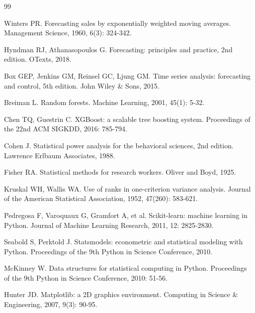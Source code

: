 

\begin{thebibliography}{99}

 Winters PR. Forecasting sales by exponentially weighted moving averages. Management Science, 1960, 6(3): 324-342.

 Hyndman RJ, Athanasopoulos G. Forecasting: principles and practice, 2nd edition. OTexts, 2018.

 Box GEP, Jenkins GM, Reinsel GC, Ljung GM. Time series analysis: forecasting and control, 5th edition. John Wiley \& Sons, 2015.

 Breiman L. Random forests. Machine Learning, 2001, 45(1): 5-32.

 Chen TQ, Guestrin C. XGBoost: a scalable tree boosting system. Proceedings of the 22nd ACM SIGKDD, 2016: 785-794.

 Cohen J. Statistical power analysis for the behavioral sciences, 2nd edition. Lawrence Erlbaum Associates, 1988.

 Fisher RA. Statistical methods for research workers. Oliver and Boyd, 1925.

 Kruskal WH, Wallis WA. Use of ranks in one-criterion variance analysis. Journal of the American Statistical Association, 1952, 47(260): 583-621.

 Pedregosa F, Varoquaux G, Gramfort A, et al. Scikit-learn: machine learning in Python. Journal of Machine Learning Research, 2011, 12: 2825-2830.

 Seabold S, Perktold J. Statsmodels: econometric and statistical modeling with Python. Proceedings of the 9th Python in Science Conference, 2010.

 McKinney W. Data structures for statistical computing in Python. Proceedings of the 9th Python in Science Conference, 2010: 51-56.

 Hunter JD. Matplotlib: a 2D graphics environment. Computing in Science \& Engineering, 2007, 9(3): 90-95.

\end{thebibliography}
